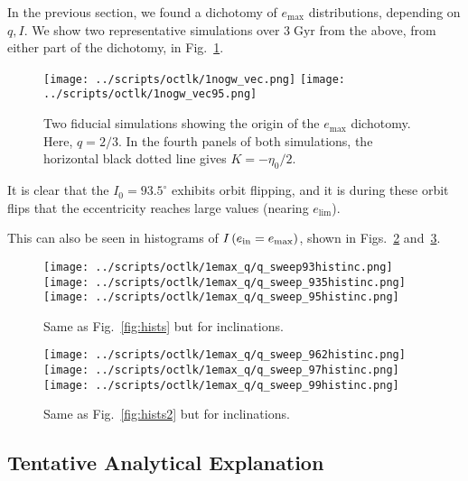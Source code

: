 \documentclass[11pt,
        usenames, %
        dvipsnames %
    ]{article}
\newcommand*{\p}[1]{\left(#1\right)}
\begin{document}
In the previous section, we found a dichotomy of $e_{\max}$ distributions,
depending on $q, I$. We show two representative simulations over
$3\;\mathrm{Gyr}$ from the above, from either part of the dichotomy, in
Fig.~\ref{fig:fiducial}.
\begin{figure}
    \centering
    \texttt{[image: ../scripts/octlk/1nogw\_vec.png]}
    \texttt{[image: ../scripts/octlk/1nogw\_vec95.png]}
    \caption{Two fiducial simulations showing the origin of the $e_{\max}$
    dichotomy. Here, $q = 2/3$. In the fourth panels of both simulations, the
    horizontal black dotted line gives $K = -\eta_0/2$.}\label{fig:fiducial}
\end{figure}

It is clear that the $I_0 = 93.5^\circ$ exhibits orbit flipping, and it is
during these orbit flips that the eccentricity reaches large values (nearing
$e_{\lim}$).

This can also be seen in histograms of $I\p{e_{\rm in} = e_{\max}}$, shown in
Figs.~\ref{fig:histinc} and~\ref{fig:histinc2}.
\begin{figure}
    \centering
    \texttt{[image: ../scripts/octlk/1emax\_q/q\_sweep93histinc.png]}
    \texttt{[image: ../scripts/octlk/1emax\_q/q\_sweep\_935histinc.png]}
    \texttt{[image: ../scripts/octlk/1emax\_q/q\_sweep\_95histinc.png]}
    \caption{Same as Fig.~\ref{fig:hists} but for inclinations.}\label{fig:histinc}
\end{figure}
\begin{figure}
    \centering
    \texttt{[image: ../scripts/octlk/1emax\_q/q\_sweep\_962histinc.png]}
    \texttt{[image: ../scripts/octlk/1emax\_q/q\_sweep\_97histinc.png]}
    \texttt{[image: ../scripts/octlk/1emax\_q/q\_sweep\_99histinc.png]}
    \caption{Same as Fig.~\ref{fig:hists2} but for inclinations.}\label{fig:histinc2}
\end{figure}

\subsection{Tentative Analytical Explanation}
\end{document}
